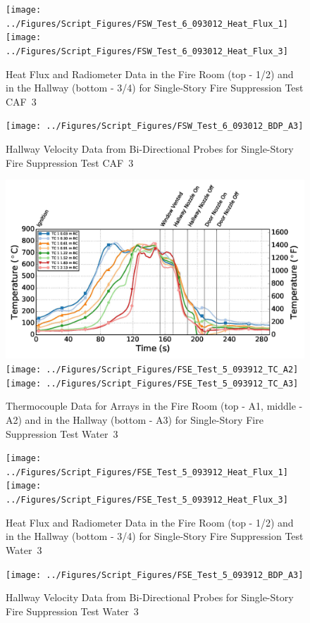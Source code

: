 \documentclass[12pt,oneside]{book}
\begin{document}
\begin{figure}[ht]
\texttt{[image: ../Figures/Script\_Figures/FSW\_Test\_6\_093012\_Heat\_Flux\_1]}
\texttt{[image: ../Figures/Script\_Figures/FSW\_Test\_6\_093012\_Heat\_Flux\_3]}
\caption{Heat Flux and Radiometer Data in the Fire Room (top - 1/2) and in the Hallway (bottom - 3/4) for Single-Story Fire Suppression Test CAF~3}
\end{figure}

\begin{figure}[ht]
\texttt{[image: ../Figures/Script\_Figures/FSW\_Test\_6\_093012\_BDP\_A3]}
\caption{Hallway Velocity Data from Bi-Directional Probes for Single-Story Fire Suppression Test CAF~3}
\end{figure}

\begin{figure}[ht]
\includegraphics[width=.725\columnwidth]{../Figures/Script_Figures/FSE_Test_5_093912_TC_A1}
\texttt{[image: ../Figures/Script\_Figures/FSE\_Test\_5\_093912\_TC\_A2]}
\texttt{[image: ../Figures/Script\_Figures/FSE\_Test\_5\_093912\_TC\_A3]}
\caption{Thermocouple Data for Arrays in the Fire Room (top - A1, middle - A2) and in the Hallway (bottom - A3) for Single-Story Fire Suppression Test Water~3}
\end{figure}

\begin{figure}[ht]
\texttt{[image: ../Figures/Script\_Figures/FSE\_Test\_5\_093912\_Heat\_Flux\_1]}
\texttt{[image: ../Figures/Script\_Figures/FSE\_Test\_5\_093912\_Heat\_Flux\_3]}
\caption{Heat Flux and Radiometer Data in the Fire Room (top - 1/2) and in the Hallway (bottom - 3/4) for Single-Story Fire Suppression Test Water~3}
\end{figure}

\clearpage

\begin{figure}[ht]
\texttt{[image: ../Figures/Script\_Figures/FSE\_Test\_5\_093912\_BDP\_A3]}
\caption{Hallway Velocity Data from Bi-Directional Probes for Single-Story Fire Suppression Test Water~3}
\end{figure}
\end{document}
